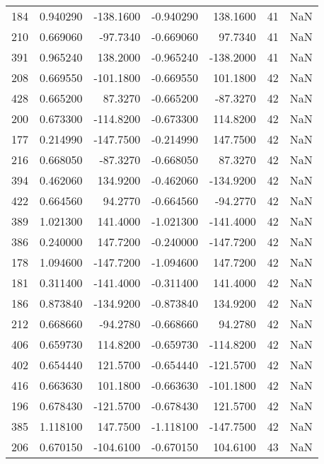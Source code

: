 \begin{tabular}{rrrrrrr}
 184 &    0.940290 & -138.1600 &   -0.940290 &    138.1600 &          41 & NaN \\
 210 &    0.669060 &  -97.7340 &   -0.669060 &     97.7340 &          41 & NaN \\
 391 &    0.965240 &  138.2000 &   -0.965240 &   -138.2000 &          41 & NaN \\
 208 &    0.669550 & -101.1800 &   -0.669550 &    101.1800 &          42 & NaN \\
 428 &    0.665200 &   87.3270 &   -0.665200 &    -87.3270 &          42 & NaN \\
 200 &    0.673300 & -114.8200 &   -0.673300 &    114.8200 &          42 & NaN \\
 177 &    0.214990 & -147.7500 &   -0.214990 &    147.7500 &          42 & NaN \\
 216 &    0.668050 &  -87.3270 &   -0.668050 &     87.3270 &          42 & NaN \\
 394 &    0.462060 &  134.9200 &   -0.462060 &   -134.9200 &          42 & NaN \\
 422 &    0.664560 &   94.2770 &   -0.664560 &    -94.2770 &          42 & NaN \\
 389 &    1.021300 &  141.4000 &   -1.021300 &   -141.4000 &          42 & NaN \\
 386 &    0.240000 &  147.7200 &   -0.240000 &   -147.7200 &          42 & NaN \\
 178 &    1.094600 & -147.7200 &   -1.094600 &    147.7200 &          42 & NaN \\
 181 &    0.311400 & -141.4000 &   -0.311400 &    141.4000 &          42 & NaN \\
 186 &    0.873840 & -134.9200 &   -0.873840 &    134.9200 &          42 & NaN \\
 212 &    0.668660 &  -94.2780 &   -0.668660 &     94.2780 &          42 & NaN \\
 406 &    0.659730 &  114.8200 &   -0.659730 &   -114.8200 &          42 & NaN \\
 402 &    0.654440 &  121.5700 &   -0.654440 &   -121.5700 &          42 & NaN \\
 416 &    0.663630 &  101.1800 &   -0.663630 &   -101.1800 &          42 & NaN \\
 196 &    0.678430 & -121.5700 &   -0.678430 &    121.5700 &          42 & NaN \\
 385 &    1.118100 &  147.7500 &   -1.118100 &   -147.7500 &          42 & NaN \\
 206 &    0.670150 & -104.6100 &   -0.670150 &    104.6100 &          43 & NaN \\

\end{tabular}
